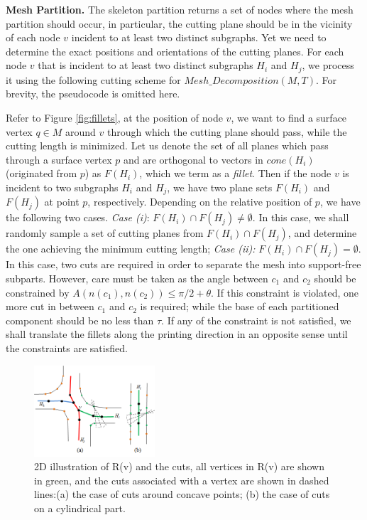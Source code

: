 \textbf{Mesh Partition.} The skeleton partition returns a set of nodes where the mesh partition should occur, in particular, the cutting plane should be in the vicinity of each node $v$ incident to at least two distinct subgraphs. Yet we need to determine the exact positions and orientations of the cutting planes. For each node $v$ that is incident to at least two distinct subgraphs $H_i$ and $H_j$, we process it using the following cutting scheme for \textbf{$Mesh\_Decomposition(M, T)$}. For brevity, the pseudocode is omitted here.


Refer to Figure \ref{fig:fillets}, at the position of node $v$, we want to find a surface vertex $q \in M$ around $v$ through which the cutting plane should pass, while the cutting length is minimized. Let us denote the set of all planes which pass through a surface vertex $p$ and are orthogonal to vectors in $cone(H_i)$ (originated from $p$)  as $F(H_i)$, which we term as a \emph{fillet}. Then if the node $v$ is incident to two subgraphs $H_i$ and $H_j$, we have two plane sets $F(H_i)$ and $F(H_j)$ at point $p$, respectively. Depending on the relative position of $p$, we have the following two cases. \emph{Case (i)}: $F(H_i) \cap F(H_j) \neq \emptyset$. In this case, we shall randomly sample a set of cutting planes from $F(H_i) \cap F(H_j)$, and determine the one achieving the minimum cutting length; \emph{Case (ii):} $F(H_i) \cap F(H_j) = \emptyset$. In this case, two cuts are required in order to separate the mesh into support-free subparts. However, care must be taken as the angle between $c_1$ and $c_2$ should be constrained by $A(n(c_1), n(c_2)) \leq \pi/2+ \theta$. If this constraint is violated, one more cut in between $c_1$ and $c_2$ is required; while the base of each partitioned component should be no less than $\tau$. If any of the constraint is not satisfied, we shall translate the fillets along the printing direction in an opposite sense until the constraints are satisfied.

\begin{figure}[tbp]
  \centering
  \includegraphics[width=0.4\textwidth]{figs/forward_tracing.png}
  \caption{\label{fig:forward_tracing}%
           2D illustration of R(v) and the cuts, all vertices in R(v) are shown in green, and the cuts associated with a vertex are shown in dashed lines:(a) the case of cuts around concave points; (b) the case of cuts on a cylindrical part.}
\end{figure}

